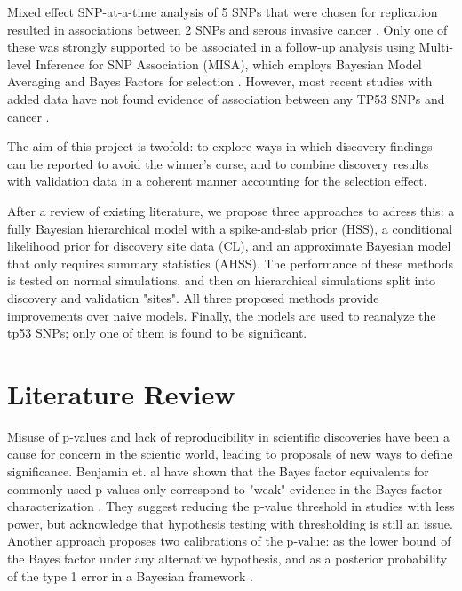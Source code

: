 \documentclass[AMA,STIX1COL]{WileyNJD-v2}\usepackage[]{graphicx}\usepackage[]{color}
\begin{document}
Mixed effect SNP-at-a-time analysis of 5 SNPs that were chosen for replication resulted in associations between 2 SNPs and serous invasive cancer \cite{Schildkraut2349}. Only one of these was strongly supported to be associated in a follow-up analysis using Multi-level Inference for SNP Association (MISA), which employs Bayesian Model Averaging and Bayes Factors for selection \cite{schildkraut2010association}. However, most recent studies with added data have not found evidence of association between any TP53 SNPs and cancer \cite{phelan2017identification}.

The aim of this project is twofold: to explore ways in which discovery findings can be reported to avoid the winner's curse, and to combine discovery results with validation data in a coherent manner accounting for the selection effect. 

After a review of existing literature, we propose three approaches to adress this: a fully Bayesian hierarchical model with a spike-and-slab prior (HSS), a conditional likelihood prior for discovery site data (CL), and an approximate Bayesian model that only requires summary statistics (AHSS). The performance of these methods is tested on normal simulations, and then on hierarchical simulations split into discovery and validation "sites". All three proposed methods provide improvements over naive models. Finally, the models are used to reanalyze the tp53 SNPs; only one of them is found to be significant.

\section{Literature Review}\label{sec:lit}

Misuse of p-values and lack of reproducibility in scientific discoveries have been a cause for concern in the scientic world, leading to proposals of new ways to define significance. Benjamin et. al have shown that the Bayes factor equivalents for commonly used p-values only correspond to "weak" evidence in the Bayes factor characterization \cite{benjamin2017redefine}. They suggest reducing the p-value threshold in studies with less power, but acknowledge that hypothesis testing with thresholding is still an issue. Another approach proposes two calibrations of the p-value: as the lower bound of the Bayes factor under any alternative hypothesis, and as a posterior probability of the type 1 error in a Bayesian framework \cite{sellke2001calibration}.
\end{document}

